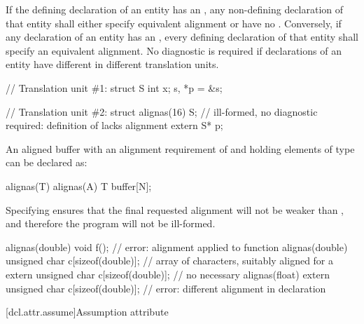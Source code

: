 \pnum
If the defining declaration of an entity has an
, any non-defining
declaration of that entity shall either specify equivalent alignment or have no
.
Conversely, if any declaration of an entity has an
,
every defining
declaration of that entity shall specify an equivalent alignment.
No diagnostic is required if declarations of an entity have
different 
in different translation units.
\begin{example}
\begin{codeblock}
// Translation unit \#1:
struct S { int x; } s, *p = &s;

// Translation unit \#2:
struct alignas(16) S;           // ill-formed, no diagnostic required: definition of  lacks alignment
extern S* p;
\end{codeblock}
\end{example}

\pnum
\begin{example}
An aligned buffer with an alignment requirement
of  and holding  elements of type 
can be declared as:
\begin{codeblock}
alignas(T) alignas(A) T buffer[N];
\end{codeblock}
Specifying  ensures
that the final requested alignment will not be weaker than ,
and therefore the program will not be ill-formed.
\end{example}

\pnum
\begin{example}
\begin{codeblock}
alignas(double) void f();                           // error: alignment applied to function
alignas(double) unsigned char c[sizeof(double)];    // array of characters, suitably aligned for a 
extern unsigned char c[sizeof(double)];             // no  necessary
alignas(float)
  extern unsigned char c[sizeof(double)];           // error: different alignment in declaration
\end{codeblock}
\end{example}

[dcl.attr.assume]{Assumption attribute}

